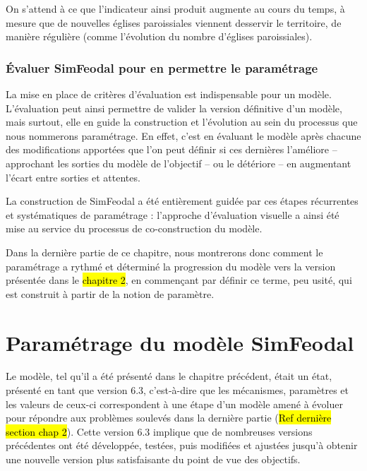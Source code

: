 On s'attend à ce que l'indicateur ainsi produit augmente au cours du temps, à mesure que de nouvelles églises paroissiales viennent desservir le territoire, de manière régulière (comme l'évolution du nombre d'églises paroissiales).

\subsubsection{Évaluer SimFeodal pour en permettre le paramétrage}


La mise en place de critères d'évaluation est indispensable pour un modèle.
L'évaluation peut ainsi permettre de \og valider\fg{} la version définitive d'un modèle, mais surtout, elle en guide la construction et l'évolution au sein du processus que nous nommerons paramétrage.
En effet, c'est en évaluant le modèle après chacune des modifications apportées que l'on peut définir si ces dernières l'améliore -- approchant les sorties du modèle de l'objectif -- ou le détériore -- en augmentant l'écart entre sorties et attentes.

La construction de SimFeodal a été entièrement guidée par ces étapes récurrentes et systématiques de paramétrage : l'approche d'évaluation visuelle a ainsi été mise au service du processus de co-construction du modèle.

Dans la dernière partie de ce chapitre, nous montrerons donc comment le paramétrage a rythmé et déterminé la progression du modèle vers la version présentée dans le \hl{chapitre 2}, en commençant par définir ce terme, peu usité, qui est construit à partir de la notion de paramètre.

%
\section{Paramétrage du modèle SimFeodal}


Le modèle, tel qu'il a été présenté dans le chapitre précédent, était un \og état\fg{}, présenté en tant que \og version 6.3\fg{}, c'est-à-dire que les mécanismes, paramètres et les valeurs de ceux-ci correspondent à une étape d'un modèle amené à évoluer pour répondre aux problèmes soulevés dans la dernière partie (\hl{Ref dernière section chap 2}).
Cette version 6.3 implique que de nombreuses versions précédentes ont été développée, testées, puis modifiées et ajustées jusqu'à obtenir une nouvelle version plus satisfaisante du point de vue des objectifs.

